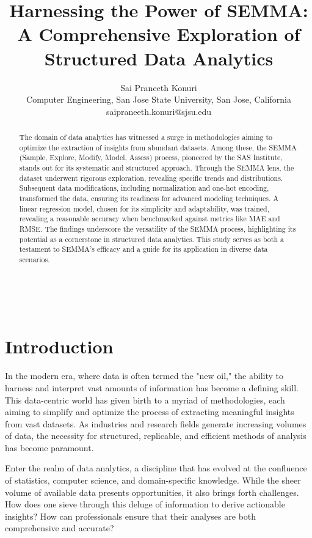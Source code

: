 \documentclass{article}
\title{Harnessing the Power of SEMMA: A Comprehensive Exploration of Structured Data Analytics}
\author{Sai Praneeth Konuri\\
        \small Computer Engineering, San Jose State University, San Jose, California \\
        \small {saipraneeth.konuri@sjsu.edu}
}
\date{} %
\begin{document}
\maketitle

\begin{abstract} 
\noindent The domain of data analytics has witnessed a surge in methodologies aiming to optimize the extraction of insights from abundant datasets. Among these, the SEMMA (Sample, Explore, Modify, Model, Assess) process, pioneered by the SAS Institute, stands out for its systematic and structured approach. Through the SEMMA lens, the dataset underwent rigorous exploration, revealing specific trends and distributions. Subsequent data modifications, including normalization and one-hot encoding, transformed the data, ensuring its readiness for advanced modeling techniques. A linear regression model, chosen for its simplicity and adaptability, was trained, revealing a reasonable accuracy when benchmarked against metrics like MAE and RMSE. The findings underscore the versatility of the SEMMA process, highlighting its potential as a cornerstone in structured data analytics. This study serves as both a testament to SEMMA's efficacy and a guide for its application in diverse data scenarios.

  \end{abstract}

\noindent{}\\


\section{Introduction}

In the modern era, where data is often termed the "new oil," the ability to harness and interpret vast amounts of information has become a defining skill. This data-centric world has given birth to a myriad of methodologies, each aiming to simplify and optimize the process of extracting meaningful insights from vast datasets. As industries and research fields generate increasing volumes of data, the necessity for structured, replicable, and efficient methods of analysis has become paramount.

Enter the realm of data analytics, a discipline that has evolved at the confluence of statistics, computer science, and domain-specific knowledge. While the sheer volume of available data presents opportunities, it also brings forth challenges. How does one sieve through this deluge of information to derive actionable insights? How can professionals ensure that their analyses are both comprehensive and accurate?
\end{document}
